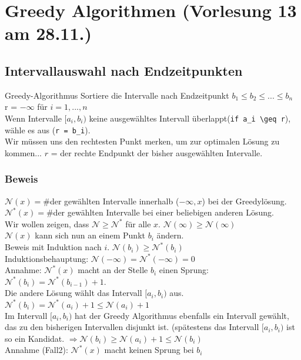 \section{Greedy Algorithmen \tiny (Vorlesung 13 am 28.11.)}

\subsection{Intervallauswahl nach Endzeitpunkten}
Greedy-Algorithmus 
Sortiere die Intervalle nach Endzeitpunkt $b_1 \leq b_2 \leq ... \leq b_n$\\
r = $-\infty$
für $i = 1,...,n$\\ 
Wenn Intervalle $[a_i,b_i)$ keine ausgewähltes Intervall überlappt(\lstinline!if a_i \geq r!), wähle es aus (\lstinline!r = b_i!).\\
Wir müssen uns den rechtesten Punkt merken, um zur optimalen Lösung zu kommen...
$r$ = der rechte Endpunkt der bisher ausgewählten Intervalle.
\subsubsection{Beweis}
$\mathcal{N}(x) = \#$der gewählten Intervalle innerhalb ($-\infty,x$) bei der Greedylösung.\\
$\mathcal{N}^*(x) = \#$der gewählten Intervalle bei einer beliebigen anderen Lösung.\\
Wir wollen zeigen, dass $\mathcal{N} \geq \mathcal{N}^*$ für alle $x$. $\mathcal{N}(\infty) \geq \mathcal{N}(\infty)$\\
$\mathcal{N}(x)$ kann sich nun an einem Punkt $b_i$ ändern.\\
Beweis mit Induktion nach $i$. $\mathcal{N}(b_i)\geq \mathcal{N}^*(b_i)$\\
Induktionsbehauptung: $\mathcal{N}(-\infty) = \mathcal{N}^*(-\infty) = 0$\\
Annahme: $\mathcal{N}^*(x)$ macht an der Stelle $b_i$ einen Sprung: $\mathcal{N}^*(b_i) = \mathcal{N}^*(b_{i-1})+1$.\\
Die andere Lösung wählt das Intervall $[a_i,b_i)$ aus.\\
$\mathcal{N}^*(b_i)  = \mathcal{N}^*(a_i)+1 \leq \mathcal{N}(a_i)+1$\\
Im Intervall $[a_i,b_i)$ hat der Greedy Algorithmus ebenfalls ein Intervall gewählt, das zu den bisherigen Intervallen disjunkt ist. (spätestens das Intervall $[a_i,b_i)$ ist so ein Kandidat. $\Rightarrow \mathcal{N}(b_i) \geq \mathcal{N}(a_i)+1 \leq \mathcal{N}(b_i)$ \\%
Annahme (Fall2): $\mathcal{N}^*(x) $ macht keinen Sprung bei $b_i$\\%

